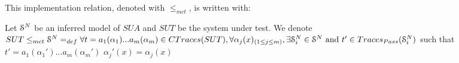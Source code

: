 %
%

This implementation relation, denoted with $\leq_{mct}$, is written with:

\begin{definition}
	\label{impl21}
	 Let $\EuScript{S}^{N}$ be an inferred model of $\mathit{SUA}$ and
	 $\mathit{SUT}$ be the system under test.
	We denote ${SUT} \leq_{mct} \EuScript{S}^{N} =_{def} \forall t=
	a_1(\alpha_1)...a_m(\alpha_m) \in CTraces({SUT}), \forall \alpha_j(x)_{(1 \leq j \leq m)}, \exists
	\EuScript{S}_i^{N} \in \EuScript{S}^{N} \text{ and } t'\in Traces_{Pass}(\EuScript{S}_i^{N})$ such that $t'=a_1(\alpha_1')...a_m(\alpha_m')$  $\alpha_j'(x)=\alpha_j(x)$
\end{definition}

